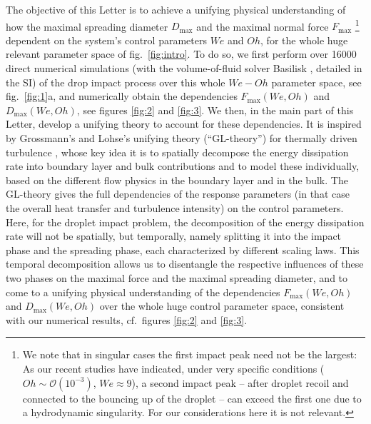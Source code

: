\documentclass[preprint,amssymb,superscriptaddress,aps,prl,floatfix]{revtex4-1}
\begin{document}
The objective of this Letter is to achieve a unifying physical 
understanding of how the maximal spreading diameter $D_\text{max}$ and the maximal
normal force $F_\text{max}$ {\footnote{ 
We note  that in singular cases the 
first impact peak need not be the largest: As our recent studies \cite{sanjayzhang2022prl,sanjay2024inertia} have indicated, under 
very specific conditions ($Oh \sim \mathcal{O}(10^{-3})$, $We \approx 9$),  
a  second impact peak -- after droplet recoil and connected to 
the bouncing up of the droplet --  can exceed the first one due to a hydrodynamic singularity. For our considerations here it is not relevant.  }}
dependent on the system's control
parameters $We$ and $Oh$, for the whole 
huge relevant parameter space of fig.\ \ref{fig:intro}. To do so, we first 
perform over 16000
direct numerical simulations (with the volume-of-fluid solver Basilisk 
\cite{popinet-basilisk,vatsal_sanjay_2023_7598181}, detailed in the SI) 
of the drop impact process over this whole $We-Oh$ 
parameter space, see
fig.\ \ref{fig:1}a, and numerically obtain the dependencies
${F}_{\text{max}}\left(We , Oh\right)$ and 
${D}_{\text{max}}\left(We, Oh \right)$, see figures \ref{fig:2}
and \ref{fig:3}. 
We then, in the main part of this Letter, develop a unifying theory to 
account for these dependencies. It is inspired by 
Grossmann's and Lohse's unifying theory (``GL-theory'') 
for thermally driven turbulence
\cite{grossmann2000scaling, grossmann2001thermal, lohse2023ultimate,lohse2024}, 
whose key idea it is to spatially decompose  the energy dissipation rate
into boundary layer
and bulk contributions and to model these individually, 
based on the different flow physics in the boundary layer and in the bulk.
The  GL-theory
gives  the full dependencies of the response parameters (in that case the overall
heat transfer and turbulence intensity) on the control parameters. 
Here, for the droplet impact problem,
the decomposition of the energy dissipation rate will not 
be spatially, but temporally, namely 
splitting it into the impact phase and the spreading phase, 
each characterized by different scaling laws. 
This temporal decomposition allows us to disentangle 
the respective influences of these two phases 
on the maximal  force and the maximal spreading diameter, and to come to a 
unifying physical 
understanding of the dependencies 
${F}_{\text{max}}\left(We , Oh\right)$ and 
${D}_{\text{max}}\left(We, Oh \right)$ over the whole huge
control parameter 
space, consistent with our numerical results, cf.\ figures \ref{fig:2} and \ref{fig:3}. 
\end{document}
